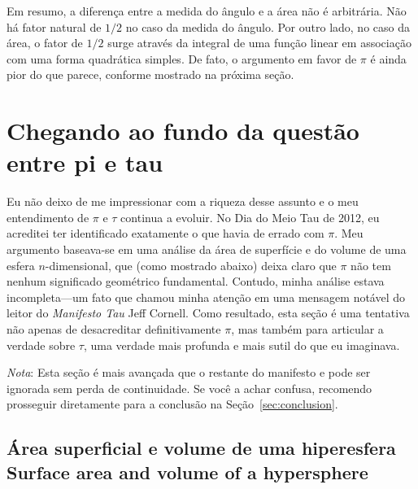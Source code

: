 {Em resumo, a diferença entre a medida do ângulo e a área não é arbitrária. \linebreak Não há fator natural de $1/2$ no caso da medida do ângulo. Por outro lado, no caso da área, o fator de $1/2$ surge através da integral de uma função linear em associação com uma forma quadrática simples. De fato, o argumento em favor de $\pi$ é ainda pior do que parece, conforme mostrado na próxima seção.


\section{Chegando ao fundo da questão entre pi e tau} %
\label{sec:getting_to_the_bottom_of_pi}

Eu não deixo de me impressionar com a riqueza desse assunto e o meu entendimento de $\pi$ e $\tau$ continua a evoluir. No Dia do Meio Tau de 2012, eu acreditei ter identificado exatamente o que havia de errado com $\pi$. Meu argumento baseava-se em uma análise da área de superfície e do volume de uma esfera $n$-dimensional, que (como mostrado abaixo) deixa claro que $\pi$ não tem nenhum significado geométrico fundamental. Contudo, minha análise estava incompleta---um fato que chamou minha atenção em uma mensagem notável do leitor do \emph{Manifesto Tau} Jeff Cornell. Como resultado, esta seção é uma tentativa não apenas de desacreditar definitivamente $\pi$, mas também para articular a verdade sobre $\tau$, uma verdade mais profunda e mais sutil do que eu imaginava.

\emph{Nota}: Esta seção é mais avançada que o restante do manifesto e pode ser ignorada sem perda de continuidade. Se você a achar confusa, recomendo prosseguir diretamente para a conclusão na Seção~\ref{sec:conclusion}.

  \subsection{Área superficial e volume de uma hiperesfera
Surface area and volume of a hypersphere} %
  \label{sec:volume_of_a_hypersphere}

}
